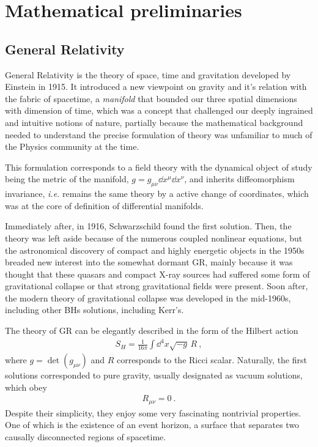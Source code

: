 
\chapter{Mathematical preliminaries} %
\label{Chapter2}


\section{General Relativity}

General Relativity is the theory of space, time and gravitation developed by Einstein in 1915. 
It introduced a new viewpoint on gravity and it's relation with the fabric of spacetime, a \emph{manifold} that bounded our three spatial dimensions with dimension of time, which was a concept that challenged our deeply ingrained and intuitive notions of nature, partially because the mathematical background needed to understand the precise formulation of theory was unfamiliar to much of the Physics community at the time.

This formulation corresponds to a field theory with the dynamical object of study being the metric of the manifold, $g=g_{\mu\nu} \dd x^\mu \dd x^\nu$, and inherits diffeomorphism invariance, \emph{i.e.} remains the same theory by a active change of coordinates, which was at the core of definition of differential manifolds.

Immediately after, in 1916, Schwarzschild found the first solution.
Then, the theory was left aside because of the numerous coupled nonlinear equations, but the astronomical discovery of compact and highly energetic objects in the 1950s breaded new interest into the somewhat dormant GR, mainly because it was thought that these quasars and compact X-ray sources had suffered some form of gravitational collapse or that strong gravitational fields were present.
Soon after, the modern theory of gravitational collapse was developed in the mid-1960s, including other BHs solutions, including Kerr's.

The theory of GR can be elegantly described in the form of the Hilbert action
\begin{align}
    S_{H} = \frac{1}{16\pi} \int \dd^4 x \sqrt{-g} \,R ~,
    \label{eq2:actionGR}
\end{align}
where $g=\det(g_{\mu\nu})$ and $R$ corresponds to the Ricci scalar.
Naturally, the first solutions corresponded to pure gravity, usually designated as vacuum solutions, which obey
\begin{align}
    R_{\mu\nu} = 0 ~.
    \label{eq2:vacuumGR}
\end{align}
Despite their simplicity, they enjoy some very fascinating nontrivial properties. 
One of which is the existence of an event horizon, a surface that separates two causally disconnected regions of spacetime.

